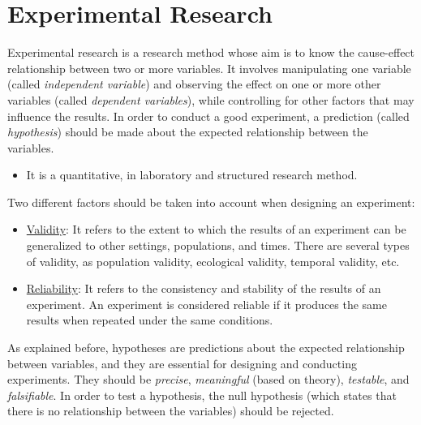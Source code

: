 \section{Experimental Research}

Experimental research is a research method whose aim is to know the cause-effect relationship between two or more variables. It involves manipulating one variable (called \emph{independent variable}) and observing the effect on one or more other variables (called \emph{dependent variables}), while controlling for other factors that may influence the results. In order to conduct a good experiment, a prediction (called \emph{hypothesis}) should be made about the expected relationship between the variables.
\begin{itemize}
    \item It is a quantitative, in laboratory and structured research method.
\end{itemize}

Two different factors should be taken into account when designing an experiment:
\begin{itemize}
    \item \ul{Validity}: It refers to the extent to which the results of an experiment can be generalized to other settings, populations, and times. There are several types of validity, as population validity, ecological validity, temporal validity, etc.
    \item \ul{Reliability}: It refers to the consistency and stability of the results of an experiment. An experiment is considered reliable if it produces the same results when repeated under the same conditions.
\end{itemize}

As explained before, hypotheses are predictions about the expected relationship between variables, and they are essential for designing and conducting experiments. They should be \emph{precise}, \emph{meaningful} (based on theory), \emph{testable}, and \emph{falsifiable}. In order to test a hypothesis, the null hypothesis (which states that there is no relationship between the variables) should be rejected.

